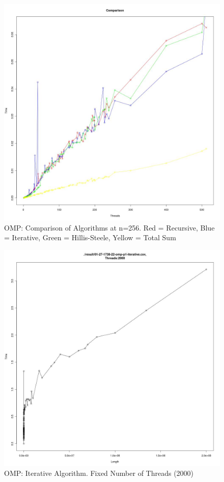 \documentclass[11pt]{article}
\begin{document}
\begin{figure}[H]
\centering
\caption{OMP: Comparison of Algorithms at n=256. Red = Recursive, Blue = Iterative, 
Green = Hillis-Steele, Yellow = Total Sum}

\includegraphics[scale=0.4]{candidate-graphs/omp_p1_compare_256.jpg}
\end{figure}

\begin{figure}[H]
\centering
\caption{OMP: Iterative Algorithm. Fixed Number of Threads (2000)}

\includegraphics[scale=0.4]{candidate-graphs/omp_p1_iterative_length_2000.jpg}
\end{figure}
\end{document}
